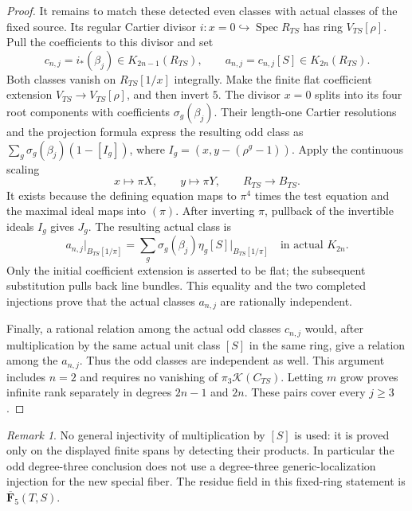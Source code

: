 \documentclass[11pt,a4paper]{amsart}
\numberwithin{equation}{section}
\theoremstyle{definition}
\theoremstyle{remark}
\newtheorem{remark}[theorem]{Remark}
\begin{document}
\begin{proof}
It remains to match these detected even classes with actual
classes of the fixed source.  Its regular Cartier divisor
$i:x=0\hookrightarrow\operatorname{Spec}R_{TS}$ has ring
$V_{TS}[\rho]$.  Pull the coefficients to this divisor and set
\[
 c_{n,j}=i_*(\beta_j)\in K_{2n-1}(R_{TS}),\qquad
 a_{n,j}=c_{n,j}[S]\in K_{2n}(R_{TS}).
\]
Both classes vanish on $R_{TS}[1/x]$ integrally.
Make the finite flat coefficient extension
$V_{TS}\to V_{TS}[\rho]$, and then invert $5$.
The divisor $x=0$ splits into its four root components with
coefficients $\sigma_g(\beta_j)$.
Their length-one Cartier resolutions and the projection
formula express the resulting odd class as
$\sum_g\sigma_g(\beta_j)(1-[I_g])$, where
$I_g=(x,y-(\rho^g-1))$.
Apply the continuous scaling
\[
 x\longmapsto\pi X,\qquad y\longmapsto\pi Y,\qquad
 R_{TS}\longrightarrow B_{TS}.
\]
It exists because the defining equation maps to $\pi^4$ times
the test equation and the maximal ideal maps into $(\pi)$.
After inverting $\pi$, pullback of the invertible ideals $I_g$
gives $J_g$. The resulting actual class is
\[
 a_{n,j}|_{B_{TS}[1/\pi]}
   =\sum_g\sigma_g(\beta_j)\eta_g[S]\big|_{B_{TS}[1/\pi]}
       \quad\text{in actual }K_{2n}.
\]
Only the initial coefficient extension is asserted to be flat;
the subsequent substitution pulls back line bundles.
This equality and the two completed injections prove that
the actual classes $a_{n,j}$ are rationally independent.

Finally, a rational relation among the actual odd classes
$c_{n,j}$ would, after multiplication by the same actual unit
class $[S]$ in the same ring, give a relation among the
$a_{n,j}$.  Thus the odd classes are independent as well.
This argument includes $n=2$ and requires no vanishing of
$\pi_3\mathcal K(C_{TS})$.
Letting $m$ grow proves infinite rank separately in degrees
$2n-1$ and $2n$.  These pairs cover every $j\geq3$.
\end{proof}

\begin{remark}
No general injectivity of multiplication by $[S]$ is used:
it is proved only on the displayed finite spans by detecting
their products.  In particular the odd degree-three conclusion
does not use a degree-three generic-localization injection for
the new special fiber.  The residue field in this fixed-ring
statement is $\overline{\mathbf F}_5(T,S)$.
\end{remark}




\appendix
\end{document}
